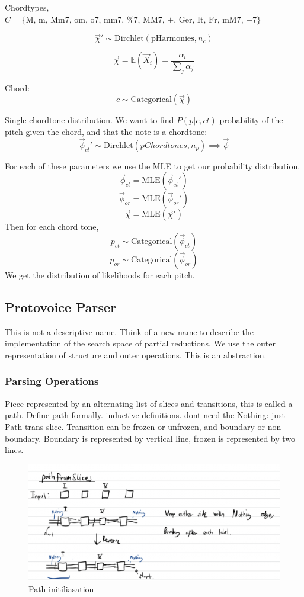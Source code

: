 \documentclass[12pt,a4paper,twoside,openright]{report}
\theoremstyle{definition}
\begin{document}
\par
Chordtypes, $C = \{\text{M,~m, Mm7, om, o7, mm7, \%7, MM7, +, Ger, It, Fr, mM7, +7}\}$

\[\vec{\chi}' \sim \text{Dirchlet} (\text{pHarmonies}, n_c) \]

\[\vec{\chi} = \mathbb{E} (\vec{X}_i) = \frac{\alpha_i}{\sum\limits_j \alpha_j} \]

Chord: \[c \sim \text{Categorical}(\vec{\chi})\]

Single chordtone distribution. We want to find $P(p|c, ct)$ probability of the pitch given the chord, and that the note is a chordtone:
\[\vec{\phi}_{ct}' \sim \text{Dirchlet}(pChordtones, n_p) \implies \vec{\phi}\]

For each of these parameters we use the MLE to get our probability distribution. 
\[\vec{\phi}_{ct} = \text{MLE} (\vec{\phi}_{ct}')\]
\[\vec{\phi}_{or} = \text{MLE} (\vec{\phi}_{or}')\]
\[\vec{\chi}= \text{MLE} (\vec{\chi}') \]
Then for each chord tone,
\[p_{ct} \sim \text{Categorical}(\vec{\phi}_{ct})\]
\[p_{or} \sim \text{Categorical}(\vec{\phi}_{or})\]
We get the distribution of likelihoods for each pitch.

%

\subsection{Protovoice Parser}
This is not a descriptive name. Think of a new name to describe the implementation of the search space of partial reductions. We use the outer representation of structure and outer operations. This is an abstraction.

\subsubsection{Parsing Operations}
Piece represented by an alternating list of slices and transitions, this is called a path. Define path formally. inductive definitions. dont need the Nothing: just Path trans slice. Transition can be frozen or unfrozen, and boundary or non boundary. Boundary is represented by vertical line, frozen is represented by two lines.

\begin{figure}[ht]
  \centering
  \includegraphics[width=\textwidth]{pathFromSlices}
  \caption{Path initiliasation}
  \label{fig:pathInit}
\end{figure}
\end{document}
